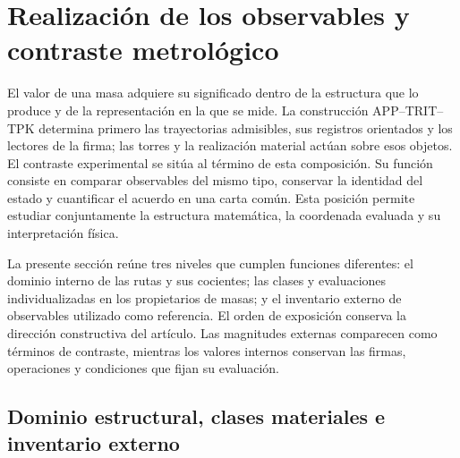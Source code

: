 
\section{Realización de los observables y contraste metrológico}
\label{vi:sec:vi-contraste-metrologico}

El valor de una masa adquiere su significado dentro de la estructura que lo
produce y de la representación en la que se mide. La construcción
APP--TRIT--TPK determina primero las trayectorias admisibles, sus registros
orientados y los lectores de la firma; las torres y la realización material
actúan sobre esos objetos. El contraste experimental se sitúa al término de
esta composición. Su función consiste en comparar observables del mismo
tipo, conservar la identidad del estado y cuantificar el acuerdo en una
carta común. Esta posición permite estudiar conjuntamente la estructura
matemática, la coordenada evaluada y su interpretación física.

La presente sección reúne tres niveles que cumplen funciones diferentes:
el dominio interno de las rutas y sus cocientes; las clases y evaluaciones
individualizadas en los propietarios de masas; y el inventario externo de
observables utilizado como referencia. El orden de exposición conserva la
dirección constructiva del artículo. Las magnitudes externas comparecen como
términos de contraste, mientras los valores internos conservan las firmas,
operaciones y condiciones que fijan su evaluación.

\subsection{Dominio estructural, clases materiales e inventario externo}
\label{vi:subsec:vi-dominios-contraste}

